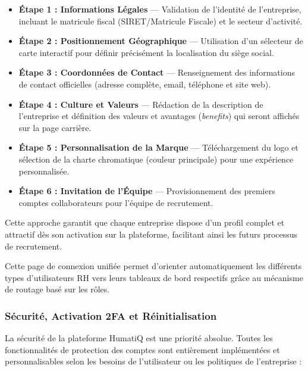 \begin{itemize}
    \item \textbf{Étape 1 : Informations Légales} — Validation de l'identité de l'entreprise, incluant le matricule fiscal (SIRET/Matricule Fiscale) et le secteur d'activité.
    \item \textbf{Étape 2 : Positionnement Géographique} — Utilisation d'un sélecteur de carte interactif pour définir précisément la localisation du siège social.
    \item \textbf{Étape 3 : Coordonnées de Contact} — Renseignement des informations de contact officielles (adresse complète, email, téléphone et site web).
    \item \textbf{Étape 4 : Culture et Valeurs} — Rédaction de la description de l'entreprise et définition des valeurs et avantages (\textit{benefits}) qui seront affichés sur la page carrière.
    \item \textbf{Étape 5 : Personnalisation de la Marque} — Téléchargement du logo et sélection de la charte chromatique (couleur principale) pour une expérience personnalisée.
    \item \textbf{Étape 6 : Invitation de l'Équipe} — Provisionnement des premiers comptes collaborateurs pour l'équipe de recrutement.
\end{itemize}

Cette approche garantit que chaque entreprise dispose d'un profil complet et attractif dès son activation sur la plateforme, facilitant ainsi les futurs processus de recrutement.

Cette page de connexion unifiée permet d'orienter automatiquement les différents types d'utilisateurs RH vers leurs tableaux de bord respectifs grâce au mécanisme de routage basé sur les rôles.

\subsubsection{Sécurité, Activation 2FA et Réinitialisation}
La sécurité de la plateforme HumatiQ est une priorité absolue. Toutes les fonctionnalités de protection des comptes sont entièrement implémentées et personnalisables selon les besoins de l'utilisateur ou les politiques de l'entreprise :

